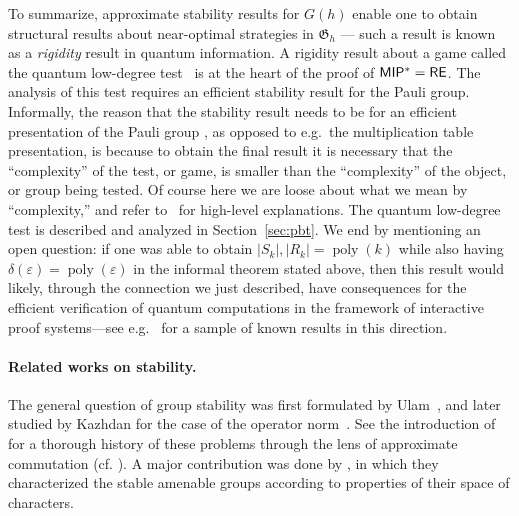 \documentclass[11pt]{article}
\theoremstyle{definition}
\DeclareMathOperator{\poly}{poly}
\newcommand{\eps}{\varepsilon}
\newcommand{\game}{\mathfrak{G}}
\begin{document}
To summarize, approximate stability results for $G(h)$ enable one to obtain structural results about near-optimal strategies in $\game_h$ --- such a result is known as a \emph{rigidity} result in quantum information. A rigidity result about a game called the quantum low-degree test~\cite{natarajan2018low} is at the heart of the proof of $\sf MIP^* = \sf RE$. The analysis of this test requires an efficient stability result for the Pauli group. Informally, the reason that the stability result needs to be for an efficient presentation of the Pauli group , as opposed to e.g.\ the multiplication table presentation, is because to obtain the final result it is necessary that the ``complexity'' of the test, or game, is smaller than the ``complexity'' of the object, or group being tested. Of course here we are loose about what we mean by ``complexity,'' and refer to~\cite{ji2021mip,vidickmip} for high-level explanations. The quantum low-degree test is described and analyzed in Section~\ref{sec:pbt}. We end by mentioning an open question: if one was able to obtain $|S_k|,|R_k|=\poly(k)$ while also having $\delta(\eps)=\poly(\eps)$ in the informal theorem stated above, then this result would likely, through the connection we just described, have consequences for the efficient verification of quantum computations in the framework of interactive proof systems---see e.g.~\cite{coladangelo2019verifier,natarajan2023bounding} for a sample of known results in this direction. 

\paragraph{Related works on stability.} The general question of group stability was first formulated by Ulam~\cite{ulam1960collection}, and later studied  by Kazhdan for the case of the operator norm~\cite{kazhdan1982e}. See the introduction of \cite{ioana2020stability} for a thorough history of these problems through the lens of approximate commutation (cf.  \cite{von1942approximative,voiculescu1983asymptotically,glebsky2010almost}). A major contribution was done by \cite{hadwin2018stability}, in which they characterized the stable amenable groups according to properties of their space of characters. 
\end{document}
